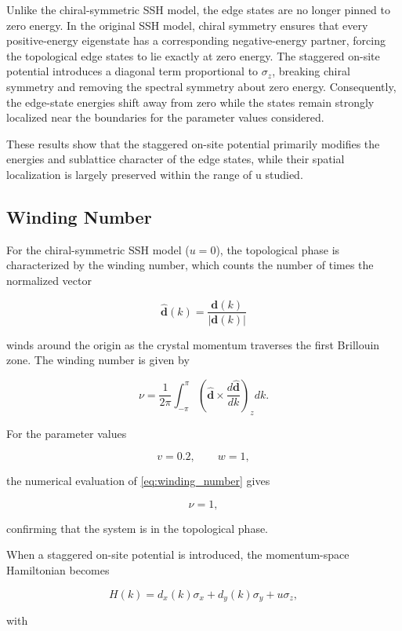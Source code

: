 \documentclass[11pt, a4paper]{article}
\begin{document}
Unlike the chiral-symmetric SSH model, the edge states are no longer pinned to zero energy. In the original SSH model, chiral symmetry ensures that every positive-energy eigenstate has a corresponding negative-energy partner, forcing the topological edge states to lie exactly at zero energy. The staggered on-site potential introduces a diagonal term proportional to $\sigma_z$, breaking chiral symmetry and removing the spectral symmetry about zero energy. Consequently, the edge-state energies shift away from zero while the states remain strongly localized near the boundaries for the parameter values considered.

These results show that the staggered on-site potential primarily modifies the energies and sublattice character of the edge states, while their spatial localization is largely preserved within the range of u studied.

\FloatBarrier


\subsection{Winding Number}

For the chiral-symmetric SSH model (\(u=0\)), the topological phase is
characterized by the winding number, which counts the number of times the
normalized vector

\[
\hat{\mathbf d}(k)=\frac{\mathbf d(k)}{|\mathbf d(k)|}
\]

winds around the origin as the crystal momentum traverses the first
Brillouin zone. The winding number is given by

\begin{equation}
\nu
=
\frac{1}{2\pi}
\int_{-\pi}^{\pi}
\left(
\hat{\mathbf d}
\times
\frac{d\hat{\mathbf d}}{dk}
\right)_{z}
dk.
\label{eq:winding_number}
\end{equation}

For the parameter values

\[
v=0.2,\qquad
w=1,
\]

the numerical evaluation of \cref{eq:winding_number} gives

\[
\nu=1,
\]

confirming that the system is in the topological phase.

When a staggered on-site potential is introduced, the momentum-space Hamiltonian becomes

\[
H(k)
=
d_x(k)\sigma_x
+
d_y(k)\sigma_y
+
u\sigma_z,
\]

with
\end{document}
